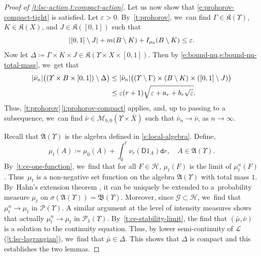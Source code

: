 \documentclass[JEP,XML,SOM,Unicode,published]{cedram}
\theoremstyle{definition}
\theoremstyle{remark}
\DeclarePairedDelimiter{\paren}{\lparen}{\rparen}
\DeclarePairedDelimiter{\abs}{\lvert}{\rvert}
\begin{document}
\begin{proof}[Proof of {\cref{t:lsc-action,t:compact-action}}]
Let us now show that \cref{e:prohorov-compact-tight} is satisfied.
Let $\varepsilon > 0$.
By~\cref{t:prohorov}, we~can find $\Gamma \in \mathfrak{K}(\varUpsilon)$, $K \in \mathfrak{K}(X)$, and $J \in \mathfrak{K}([0,1])$ such that
\begin{equation*}
\abs{[0,1] \setminus J} + m(B \setminus K) + I_{\mu_{0}}(B \setminus K) \leq \varepsilon .
\end{equation*}
Now let $\Delta \coloneq \Gamma \times K \times J \in \mathfrak{K}(\varUpsilon \times X \times [0,1])$.
Then by \cref{e:bound-nu,e:bound-nu-total-mass}, we~get that
\begin{equation*}
\begin{split}
\abs{\bar{\nu}_{n}}\paren[\big]{(\varUpsilon \times B \times [0,1]) \setminus \Delta} & \leq \abs{\bar{\nu}_{n}}\big(\paren{\varUpsilon \setminus \Gamma} \times (B \setminus K) \times ([0,1] \setminus J) \big)
\\
& \leq \varepsilon (r+1) \sqrt{\varepsilon + a_{r} + b_{r} \sqrt{\varepsilon}} .
\end{split}
\end{equation*}
Thus, \cref{t:prohorov}\,\cref{i:prohorov-compact} applies, and, up to passing to a subsequence, we~can find $\bar{\nu} \in \mathscr{M}_{b,0}(\varUpsilon \times \bar{X})$ such that $\bar{\nu}_{n} \to \bar{\nu}$, as $n \to \infty$.

Recall that $\mathfrak{A}(\varUpsilon)$ is the algebra defined in \cref{s:local-algebra}.
Define,
\begin{equation*}
\mu_{t}(A) \coloneq \mu_{0}(A) + \int_{0}^{t} \nu_{r}(\mathsf{D} 1_{A}) \mathtt{d} r, \quad A \in \mathfrak{A}(\varUpsilon).
\end{equation*}
By~\cref{t:ce-one-function}, we~find that for all $F \in \mathscr{H}$, $\mu_{t}(F)$ is the limit of $\mu^{n}_{t}(F)$.
Thus~$\mu_{t}$ is a non-negative set function on the algebra $\mathfrak{A}(\varUpsilon)$ with total mass $1$.
By~Hahn's extension theorem \cite[Th.\,III.5.8, p.\,136]{DunfordSchwartz}, it can be uniquely be extended to a~probability measure $\mu_{t}$ on $\sigma(\mathfrak{A}(\varUpsilon)) = \mathfrak{B}(\varUpsilon)$.
Moreover, since $\mathscr{G} \subset \mathscr{H}$, we~find that $\mu^{n}_{t} \to \mu_{t}$ in $\mathscr{P}(\varUpsilon)$.
A similar argument at the level of intensity measures shows that actually $\mu^{n}_{t} \to \mu_{t}$ in $\mathscr{P}_{1}(\varUpsilon)$.
By~\cref{t:ce-stability-limit}, the find that $(\bar{\mu}, \bar{\nu})$ is a solution to the continuity equation.
Thus, by lower semi-continuity of $\mathcal{L}$ (\cref{t:lsc-lagrangian}), we~find that $\bar{\mu} \in \Delta$.
This shows that $\Delta$ is compact and this establishes the two lemmas.
\end{proof}
\end{document}
